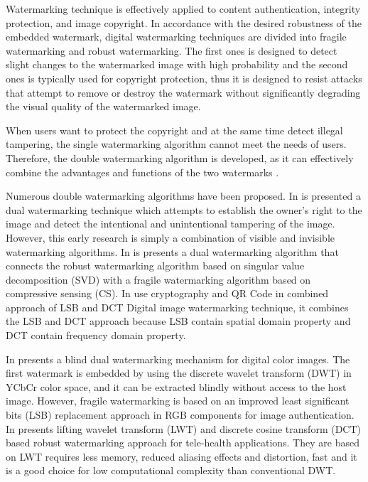 \documentclass[runningheads]{llncs}
\begin{document}
Watermarking technique is effectively applied to content authentication, integrity protection, and image copyright. In accordance with the desired robustness of the embedded watermark, digital watermarking techniques are divided into fragile watermarking and robust watermarking. The first ones is designed to detect slight changes to the watermarked image with high probability and the second ones is typically used for copyright protection, thus it is designed to resist attacks that attempt to remove or destroy the watermark without significantly degrading the visual quality of the watermarked image.

When users want to protect the copyright and at the same time detect illegal tampering, the single watermarking algorithm cannot meet the needs of users. Therefore, the double watermarking algorithm is developed, as it can effectively combine the advantages and functions of the two watermarks \cite{wang2017dual}.

Numerous double watermarking algorithms have been proposed. In \cite{mohanty1999dual} is presented a dual watermarking technique which attempts to establish the owner’s right to the image and detect the intentional and unintentional tampering of the image. However, this early research is simply a combination of visible and invisible watermarking algorithms. In \cite{wang2017dual} is presents a dual watermarking algorithm that connects the robust watermarking algorithm based on singular value decomposition (SVD) with a fragile watermarking algorithm based on compressive sensing (CS). In \cite{singh2018hybrid} use cryptography and QR Code in combined approach of LSB and DCT Digital image watermarking technique, it combines the LSB and DCT approach because LSB contain spatial domain property and DCT contain frequency domain property.

In \cite{liu2018blind} presents a blind dual watermarking mechanism for digital color images. The first watermark is embedded by using the discrete wavelet transform (DWT) in YCbCr color space, and it can be extracted blindly without access to the host image. However, fragile watermarking is based on an improved least significant bits (LSB) replacement approach in RGB components for image authentication. In \cite{singh2019robust} presents lifting wavelet transform (LWT) and discrete cosine transform (DCT) based robust watermarking approach for tele-health applications. They are based on LWT requires less memory, reduced aliasing effects and distortion, fast and it is a good choice for low computational complexity than conventional DWT.
\end{document}
